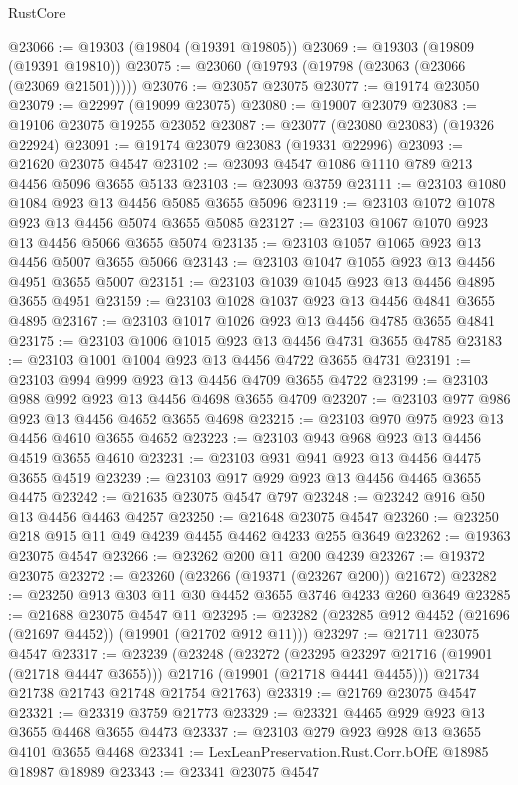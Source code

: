 \begin{lexlean}{RustCore}
\begin{coremodule}
@23066 := @19303 (@19804 (@19391 @19805))
@23069 := @19303 (@19809 (@19391 @19810))
@23075 := @23060 (@19793 (@19798 (@23063 (@23066 (@23069 @21501)))))
@23076 := @23057 @23075
@23077 := @19174 @23050
@23079 := @22997 (@19099 @23075)
@23080 := @19007 @23079
@23083 := @19106 @23075 @19255 @23052
@23087 := @23077 (@23080 @23083) (@19326 @22924)
@23091 := @19174 @23079 @23083 (@19331 @22996)
@23093 := @21620 @23075 @4547
@23102 := @23093 @4547 @1086 @1110 @789 @213 @4456 @5096 @3655 @5133
@23103 := @23093 @3759
@23111 := @23103 @1080 @1084 @923 @13 @4456 @5085 @3655 @5096
@23119 := @23103 @1072 @1078 @923 @13 @4456 @5074 @3655 @5085
@23127 := @23103 @1067 @1070 @923 @13 @4456 @5066 @3655 @5074
@23135 := @23103 @1057 @1065 @923 @13 @4456 @5007 @3655 @5066
@23143 := @23103 @1047 @1055 @923 @13 @4456 @4951 @3655 @5007
@23151 := @23103 @1039 @1045 @923 @13 @4456 @4895 @3655 @4951
@23159 := @23103 @1028 @1037 @923 @13 @4456 @4841 @3655 @4895
@23167 := @23103 @1017 @1026 @923 @13 @4456 @4785 @3655 @4841
@23175 := @23103 @1006 @1015 @923 @13 @4456 @4731 @3655 @4785
@23183 := @23103 @1001 @1004 @923 @13 @4456 @4722 @3655 @4731
@23191 := @23103 @994 @999 @923 @13 @4456 @4709 @3655 @4722
@23199 := @23103 @988 @992 @923 @13 @4456 @4698 @3655 @4709
@23207 := @23103 @977 @986 @923 @13 @4456 @4652 @3655 @4698
@23215 := @23103 @970 @975 @923 @13 @4456 @4610 @3655 @4652
@23223 := @23103 @943 @968 @923 @13 @4456 @4519 @3655 @4610
@23231 := @23103 @931 @941 @923 @13 @4456 @4475 @3655 @4519
@23239 := @23103 @917 @929 @923 @13 @4456 @4465 @3655 @4475
@23242 := @21635 @23075 @4547 @797
@23248 := @23242 @916 @50 @13 @4456 @4463 @4257
@23250 := @21648 @23075 @4547
@23260 := @23250 @218 @915 @11 @49 @4239 @4455 @4462 @4233 @255 @3649
@23262 := @19363 @23075 @4547
@23266 := @23262 @200 @11 @200 @4239
@23267 := @19372 @23075
@23272 := @23260 (@23266 (@19371 (@23267 @200)) @21672)
@23282 := @23250 @913 @303 @11 @30 @4452 @3655 @3746 @4233 @260 @3649
@23285 := @21688 @23075 @4547 @11
@23295 := @23282 (@23285 @912 @4452 (@21696 (@21697 @4452)) (@19901 (@21702 @912 @11)))
@23297 := @21711 @23075 @4547
@23317 := @23239
    (@23248
      (@23272
        (@23295 @23297 @21716 (@19901 (@21718 @4447 @3655)))
        @21716
        (@19901 (@21718 @4441 @4455)))
      @21734
      @21738
      @21743
      @21748
      @21754
      @21763)
@23319 := @21769 @23075 @4547
@23321 := @23319 @3759 @21773
@23329 := @23321 @4465 @929 @923 @13 @3655 @4468 @3655 @4473
@23337 := @23103 @279 @923 @928 @13 @3655 @4101 @3655 @4468
@23341 := LexLeanPreservation.Rust.Corr.bOfE @18985 @18987 @18989
@23343 := @23341 @23075 @4547

\end{coremodule}
\end{lexlean}
